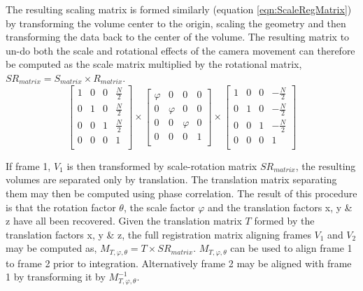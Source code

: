 The resulting scaling matrix is formed similarly (equation \ref{eqn:ScaleRegMatrix}) by transforming the volume center to the origin, scaling the geometry and then transforming the data back to the center of the volume. The resulting matrix to un-do both the scale and rotational effects of the camera movement can therefore be computed as the scale matrix multiplied by the rotational matrix, $SR_{matrix} = S_{matrix} \times R_{matrix}$. \\

\begin{equation} \label{eqn:ScaleRegMatrix}
\left[
\begin{array}{cccc}
1 & 0 & 0 & \frac{N}{2} \\
0 & 1 & 0 & \frac{N}{2} \\
0 & 0 & 1 & \frac{N}{2} \\
0 & 0 & 0 & 1 \\
\end{array}
\right] \times
\left[
\begin{array}{cccc}
\varphi & 0 & 0 & 0 \\
0 & \varphi & 0 & 0 \\
0 & 0 & \varphi & 0 \\
0 & 0 & 0 & 1 \\
\end{array}
\right] \times
\left[
\begin{array}{cccc}
1 & 0 & 0 & -\frac{N}{2} \\
0 & 1 & 0 & -\frac{N}{2} \\
0 & 0 & 1 & -\frac{N}{2} \\
0 & 0 & 0 & 1 \\
\end{array}
\right]
\end{equation}

If frame 1, $V_1$ is then transformed by scale-rotation matrix $SR_{matrix}$, the resulting volumes are separated only by translation. The translation matrix separating them may then be computed using phase correlation. The result of this procedure is that the rotation factor $\theta$, the scale factor $\varphi$ and the translation factors x, y \& z have all been recovered. Given the translation matrix $T$ formed by the translation factors x, y \& z, the full registration matrix aligning frames $V_1$ and $V_2$ may be computed as, $M_{T,\varphi,\theta} = T \times SR_{matrix}$. $M_{T,\varphi,\theta}$ can be used to align frame 1 to frame 2 prior to integration. Alternatively frame 2 may be aligned with frame 1 by transforming it by $M_{T,\varphi,\theta}^{-1}$. \\

